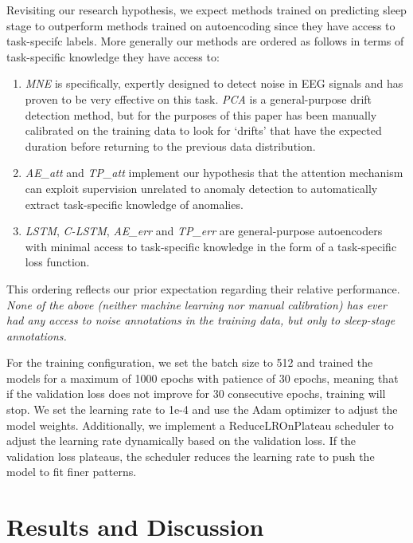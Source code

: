 \documentclass[conference]{IEEEtran}
\begin{document}
Revisiting our research hypothesis, we expect methods trained on
predicting sleep stage to outperform methods trained on autoencoding
since they have access to task-specifc labels. More generally our
methods are ordered as follows in terms of task-specific knowledge
they have access to:
%
\begin{enumerate}
\item \emph{MNE} is specifically, expertly designed to detect noise in
  EEG signals and has proven to be very effective on this task.
  \emph{PCA} is a general-purpose drift detection method, but for
  the purposes of this paper has been manually calibrated on the
  training data to look for `drifts' that have the expected duration
  before returning to the previous data distribution.
\item \emph{AE\_att} and \emph{TP\_att} implement our hypothesis that
  the attention mechanism can exploit supervision unrelated to anomaly
  detection to automatically extract task-specific knowledge of
  anomalies.
\item \emph{LSTM}, \emph{C-LSTM}, \emph{AE\_err} and \emph{TP\_err}
  are general-purpose autoencoders with minimal access to task-specific
  knowledge in the form of a task-specific loss function.
\end{enumerate}
%
This ordering reflects our prior expectation regarding their relative
performance. \emph{None of the above (neither machine learning nor
manual calibration) has ever had any access to noise annotations
in the training data, but only to sleep-stage annotations.}

For the training configuration, we set the batch size to 512 and
trained the models for a maximum of 1000 epochs with patience of 30
epochs, meaning that if the validation loss does not improve for 30
consecutive epochs, training will stop. We set the learning rate to
1e-4 and use the Adam optimizer to adjust the model
weights. Additionally, we implement a ReduceLROnPlateau scheduler to
adjust the learning rate dynamically based on the validation loss. If
the validation loss plateaus, the scheduler reduces the learning rate
to push the model to fit finer patterns.



\section{Results and Discussion}
\label{sec:results}
\end{document}

